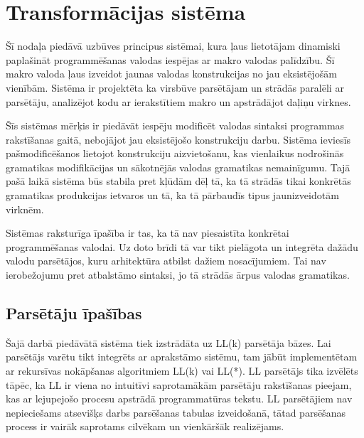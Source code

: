 \section{Transformācijas sistēma}
\label{s:system}

Šī nodaļa piedāvā uzbūves principus sistēmai, kura ļaus lietotājam dinamiski paplašināt programmēšanas valodas iespējas ar makro valodas palīdzību. Šī makro valoda ļaus izveidot jaunas valodas konstrukcijas no jau eksistējošām vienībām. Sistēma ir projektēta ka virsbūve parsētājam un strādās paralēli ar parsētāju, analizējot kodu ar ierakstītiem makro un apstrādājot daļiņu virknes.

Šīs sistēmas mērķis ir piedāvāt iespēju modificēt valodas sintaksi programmas rakstīšanas gaitā, nebojājot jau eksistējošo konstrukciju darbu. Sistēma ieviesīs pašmodificēšanos lietojot konstrukciju aizvietošanu, kas vienlaikus nodrošinās gramatikas modifikācijas un sākotnējās valodas gramatikas nemainīgumu. Tajā pašā laikā sistēma būs stabila pret kļūdām dēļ tā, ka tā strādās tikai konkrētās gramatikas produkcijas ietvaros un tā, ka tā pārbaudīs tipus jaunizveidotām virknēm.

Sistēmas raksturīga īpašība ir tas, ka tā nav piesaistīta konkrētai programmēšanas valodai. Uz doto brīdi tā var tikt pielāgota un integrēta dažādu valodu parsētājos, kuru arhitektūra atbilst dažiem nosacījumiem. Tai nav ierobežojumu pret atbalstāmo sintaksi, jo tā strādās ārpus valodas gramatikas.


\subsection{\label{sbs:sys_parserqualities}Parsētāju īpašības}

Šajā darbā piedāvātā sistēma tiek izstrādāta uz LL(k) parsētāja bāzes. Lai parsētājs varētu tikt integrēts ar aprakstāmo sistēmu, tam jābūt implementētam ar rekursīvas nokāpšanas algoritmiem LL(k) vai LL(*). LL parsētājs tika izvēlēts tāpēc, ka LL ir viena no intuitīvi saprotamākām parsētāju rakstīšanas pieejam, kas ar lejupejošo procesu apstrādā programmatūras tekstu. LL parsētājiem nav nepieciešams atsevišķs darbs parsēšanas tabulas izveidošanā, tātad parsēšanas process ir vairāk saprotams cilvēkam un vienkāršāk realizējams.

